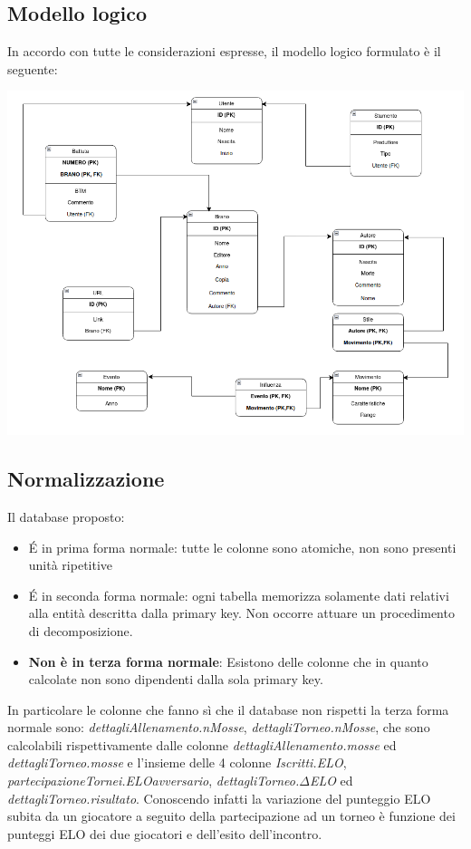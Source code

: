 \documentclass{article}
\begin{document}
    \subsection{Modello logico}

    In accordo con tutte le considerazioni espresse, il modello logico formulato è il seguente:

    \begin{center}
        \includegraphics[width=\linewidth]{immagini/logico.png}
    \end{center}

    \subsection{Normalizzazione}

    Il database proposto:
    \begin{itemize}
        \item \'E in prima forma normale: tutte le colonne sono atomiche, non sono presenti unità ripetitive
        \item \'E in seconda forma normale: ogni tabella memorizza solamente dati relativi alla entità descritta dalla primary key. Non occorre attuare un procedimento di decomposizione.
        \item \textbf{Non è in terza forma normale}: Esistono delle colonne che in quanto calcolate non sono dipendenti dalla sola primary key.
    \end{itemize}
    In particolare le colonne che fanno sì che il database non rispetti la terza forma normale sono: \textit{dettagliAllenamento.nMosse}, \textit{dettagliTorneo.nMosse}, che sono calcolabili rispettivamente dalle colonne \textit{dettagliAllenamento.mosse} ed \textit{dettagliTorneo.mosse} e l'insieme delle 4 colonne \textit{Iscritti.ELO}, \textit{partecipazioneTornei.ELOavversario}, \textit{dettagliTorneo.$\Delta$ELO} ed \textit{dettagliTorneo.risultato}. Conoscendo infatti la variazione del punteggio ELO subita da un giocatore a seguito della partecipazione ad un torneo è funzione dei punteggi ELO dei due giocatori e dell'esito dell'incontro.
\end{document}
